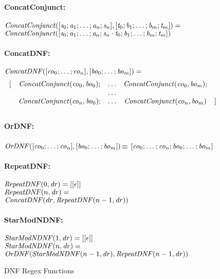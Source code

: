 \begin{figure}
\bf{ConcatConjunct}:\\
\ConcatConjunct \OfType {}\\
$\mathit{ConcatConjunct}([\mathit{s}_0;\mathit{a}_1;\ldots;\mathit{a}_n;\mathit{s}_n],[\mathit{t}_0;\mathit{b}_1;\ldots;\mathit{b}_m;\mathit{t}_m])=$\\
\hspace*{2ex}$\mathit{ConcatConjunct}([\mathit{s}_0;\mathit{a}_1;\ldots;\mathit{a}_n;\mathit{s}_n\cdot\mathit{t}_0;\mathit{b}_1;\ldots;\mathit{b}_m;\mathit{t}_m])$\\
\\
\bf{ConcatDNF}:\\
\ConcatDNF \OfType {}\\
$\mathit{ConcatDNF}([\mathit{co}_0;\ldots;\mathit{co}_n],[\mathit{bo}_0;\ldots;\mathit{bo}_m])=$
\[
\begin{array}{rcccl}
[ & \mathit{ConcatConjunct}(\mathit{co}_0,\mathit{bo}_0); & \ldots & \mathit{ConcatConjunct}(\mathit{co}_0,\mathit{bo}_m); \\
& & \ldots & \\
& \mathit{ConcatConjunct}(\mathit{co}_n,\mathit{bo}_0); & \ldots & \mathit{ConcatConjunct}(\mathit{co}_n,\mathit{bo}_m) & ]
\end{array}
\]
\\
\bf{OrDNF}:\\
\OrDNF \OfType {}\\
$\mathit{OrDNF}([\mathit{co}_0;\ldots;\mathit{co}_n],[\mathit{bo}_0;\ldots;\mathit{bo}_m])$=
\hspace*{2ex}$[\mathit{co}_0;\ldots;\mathit{co}_n;\mathit{bo}_0;\ldots;\mathit{bo}_m]$\\
\\
\bf{RepeatDNF}:\\
\RepeatDNF \OfType {}\\
$\mathit{RepeatDNF}(0,\mathit{dr})=[[\epsilon]]$\\
$\mathit{RepeatDNF}(n,\mathit{dr})=$\\
\hspace*{2ex}$\mathit{ConcatDNF}(\mathit{dr},\mathit{RepeatDNF}(n-1,\mathit{dr}))$\\
\\
\bf{StarModNDNF}:\\
\StarModNDNF \OfType {}\\
$\mathit{StarModNDNF}(1,\mathit{dr})=[[\epsilon]]$\\
$\mathit{StarModNDNF}(n,\mathit{dr})=$\\
\hspace*{2ex}$\mathit{OrDNF}(\mathit{StarModNDNF}(n-1,\mathit{dr}),\mathit{RepeatDNF}(n-1,\mathit{dr}))$

\caption{DNF Regex Functions }
\label{fig:dnf-regex-functions}
\end{figure}
